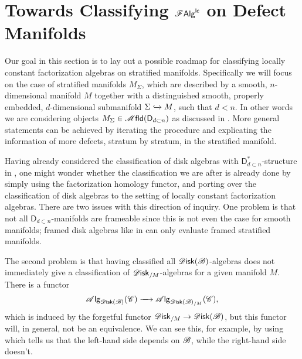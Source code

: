 \documentclass[../text.tex]{subfiles}
\begin{document}
\section{Towards Classifying \texorpdfstring{$\mathscr{F} \mathsf{Alg}^{\mathsf{lc}}$}{FAlglc} on Defect Manifolds}\label{ch:classif_defect_mfld}

Our goal in this section is to lay out a possible roadmap for classifying locally constant factorization algebras on stratified manifolds. Specifically we will focus on the case of stratified manifolds $M_{\Sigma}$, which are described by a smooth, $n$-dimensional manifold $M$ together with a distinguished smooth, properly embedded, $d$-dimensional submanifold $\Sigma \xhookrightarrow{} M$, such that $d < n$. In other words we are considering objects $M_{\Sigma} \in \mfld(\mathsf{D}_{d \subset n})$ as discussed in . More general statements can be achieved by iterating the procedure and explicating the information of more defects, stratum by stratum, in the stratified manifold.

\begin{remark}\label{rem:disk_not_enough}
    Having already considered the classification of disk algebras with $\mathsf{D}_{d \subset n}^*$-structure in , one might wonder whether the classification we are after is already done by simply using the factorization homology functor, and porting over the classification of disk algebras to the setting of locally constant factorization algebras. There are two issues with this direction of inquiry. One problem is that not all $\mathsf{D}_{d \subset n}$-manifolds are frameable since this is not even the case for smooth manifolds; framed disk algebras like in  can only evaluate framed stratified manifolds.
    
    The second problem is that having classified all $\disk(\bstr)$-algebras does not immediately give a classification of $\disk_{/M}$-algebras for a given manifold $M$. There is a functor
    \begin{equation}
        \alg{\disk(\bstr)}(\catC) \xrightarrow{\quad} \alg{\disk(\bstr)_{/M}} (\catC),
    \end{equation}
    which is induced by the forgetful functor $\disk_{/M} \rightarrow \disk(\bstr)$, but this functor will, in general, not be an equivalence. We can see this, for example, by using  which tells us that the left-hand side depends on $\mathscr{B}$, while the right-hand side doesn't. 
\end{remark}
\end{document}
